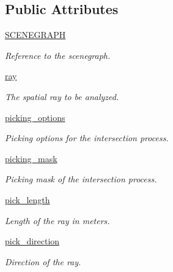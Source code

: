 \subsection*{\-Public \-Attributes}
\begin{DoxyCompactItemize}
\item 
\hyperlink{classlib_1_1Intersection_1_1Intersection_af5dafd3b3480af4a8dd0e16cc31e4294}{\-S\-C\-E\-N\-E\-G\-R\-A\-P\-H}
\begin{DoxyCompactList}\small\item\em \-Reference to the scenegraph. \end{DoxyCompactList}\item 
\hyperlink{classlib_1_1Intersection_1_1Intersection_a9d06103ebb441f8e0d4b24ac2a36ff51}{ray}
\begin{DoxyCompactList}\small\item\em \-The spatial ray to be analyzed. \end{DoxyCompactList}\item 
\hyperlink{classlib_1_1Intersection_1_1Intersection_a4f12c5d21a96db855b981ed5ff89bed2}{picking\-\_\-options}
\begin{DoxyCompactList}\small\item\em \-Picking options for the intersection process. \end{DoxyCompactList}\item 
\hyperlink{classlib_1_1Intersection_1_1Intersection_a0d7872b7eba2c5bd05a6ed665ee60913}{picking\-\_\-mask}
\begin{DoxyCompactList}\small\item\em \-Picking mask of the intersection process. \end{DoxyCompactList}\item 
\hyperlink{classlib_1_1Intersection_1_1Intersection_a0da8b24f0692f2c46ad7580db973ba95}{pick\-\_\-length}
\begin{DoxyCompactList}\small\item\em \-Length of the ray in meters. \end{DoxyCompactList}\item 
\hyperlink{classlib_1_1Intersection_1_1Intersection_ae74f509c5388cd83b6cb585c78e80370}{pick\-\_\-direction}
\begin{DoxyCompactList}\small\item\em \-Direction of the ray. \end{DoxyCompactList}\end{DoxyCompactItemize}
